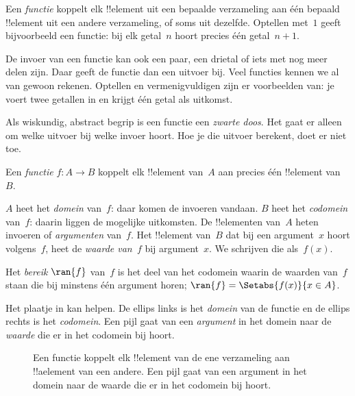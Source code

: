 \documentclass[../../../include/open-logic-section]{subfiles}
\begin{document}

\begin{explain}
Een \emph{functie} koppelt elk !!{element} uit een bepaalde verzameling aan
één bepaald !!{element} uit een andere verzameling, of soms uit dezelfde.
Optellen met~$1$ geeft bijvoorbeeld een functie: bij elk getal~$n$ hoort
precies één getal~$n+1$.
  
De invoer van een functie kan ook een paar, een drietal of iets met nog meer
delen zijn. Daar geeft de functie dan een uitvoer bij. Veel functies kennen we
al van gewoon rekenen.
Optellen en vermenigvuldigen zijn er voorbeelden van: je voert twee getallen
in en krijgt één getal als uitkomst.

Als wiskundig, abstract begrip is een functie een \emph{zwarte doos}. Het gaat
er alleen om welke uitvoer bij welke invoer hoort. Hoe je die uitvoer berekent,
doet er niet toe.
\end{explain}

\begin{defn}[Functie]
Een \emph{functie} $f \colon A \to B$ koppelt elk !!{element} van~$A$ aan
precies één !!{element} van~$B$.

$A$ heet het \emph{domein} van~$f$: daar komen de invoeren vandaan. $B$ heet
het \emph{codomein} van~$f$: daarin liggen de mogelijke uitkomsten. De
!!{element}en van~$A$ heten invoeren of \emph{argumenten}
van~$f$. Het !!{element} van~$B$ dat bij een argument~$x$ hoort volgens~$f$,
heet de \emph{waarde van~$f$} bij argument~$x$. We schrijven die als~$f(x)$.

Het \emph{bereik} $\ran{f}$ van~$f$ is het deel van het codomein waarin de
waarden van~$f$ staan die bij minstens één argument horen; $\ran{f} =
\Setabs{f(x)}{x \in A}$.
\end{defn}

Het plaatje in  kan helpen. De ellips links is het
\emph{domein} van de functie en de ellips rechts is het \emph{codomein}.
Een pijl gaat van een \emph{argument} in het domein naar de \emph{waarde} die
er in het codomein bij hoort.

\begin{figure}
  \caption{Een functie koppelt elk !!{element} van de ene verzameling aan
    !!a{element} van een andere. Een pijl gaat van een argument in het
    domein naar de waarde die er in het codomein bij hoort.}
\end{figure}
\end{document}
